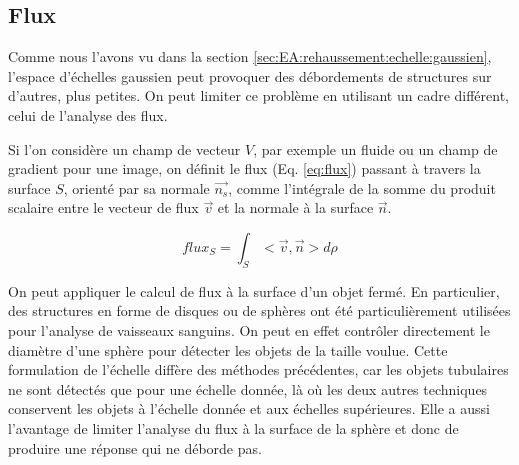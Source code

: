   \subsection{Flux}
  \label{sec:EA:rehaussement:echelle:flux}
  
  Comme nous l'avons vu dans la section \ref{sec:EA:rehaussement:echelle:gaussien}, l'espace d'échelles gaussien peut provoquer des débordements de structures sur d'autres, plus petites. On peut limiter ce problème en utilisant un cadre différent, celui de l'analyse des flux.
  
  Si l'on considère un champ de vecteur $V$, par exemple un fluide ou un champ de gradient pour une image, on définit le flux (Eq. \ref{eq:flux}) passant à travers la surface $S$, orienté par sa normale $\vec{n_s}$, comme l'intégrale de la somme du produit scalaire entre le vecteur de flux $\vec{v}$ et la normale à la surface $\vec{n}$.
  
  \begin{equation}
  flux_S = \int_{S}< \vec{v},\vec{n} > d\rho
  \label{eq:flux}
  \end{equation}
  
  On peut appliquer le calcul de flux à la surface d'un objet fermé. En particulier, des structures en forme de disques ou de sphères ont été particulièrement utilisées pour l'analyse de vaisseaux sanguins. On peut en effet contrôler directement le diamètre d'une sphère pour détecter les objets de la taille voulue. Cette formulation de l'échelle diffère des méthodes précédentes, car les objets tubulaires ne sont détectés que pour une échelle donnée, là où les deux autres techniques conservent les objets à l'échelle donnée et aux échelles supérieures. Elle a aussi l'avantage de limiter l'analyse du flux à la surface de la sphère et donc de produire une réponse qui ne déborde pas.
  
